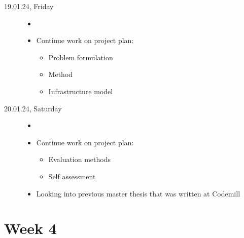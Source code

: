 \documentclass[a4, 11pt]{scrartcl}
\begin{document}
\begin{description}
\item[19.01.24, Friday]

\begin{itemize}
	\item[]
				\item Continue work on project plan:
	\begin{itemize}
		\item Problem formulation
		\item Method
		\item Infrastructure model
	\end{itemize}
\end{itemize}







\item[20.01.24, Saturday]

\begin{itemize}
	\item[]
	\item Continue work on project plan:
	\begin{itemize}
		\item Evaluation methods
		\item Self assessment
	\end{itemize}
	\item Looking into previous master thesis that was written at Codemill
\end{itemize}

	\end{description}








\newpage
\section*{Week 4}
\end{document}
